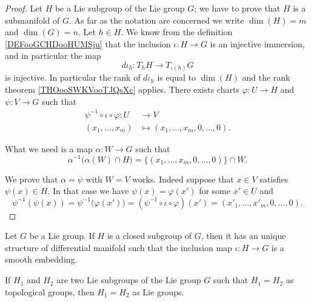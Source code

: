 \begin{proof}
    Let \( H\) be a Lie subgroup of the Lie group \( G\); we have to prove that \( H\) is a submanifold of \( G\). As far as the notation are concerned we write \( \dim(H)=m\) and \( \dim(G)=n\). Let \( h\in H\). We know from the definition \ref{DEFooGCHDooHUMSju} that the inclusion \( \iota\colon H\to G\) is an injective immersion, and in particular the map
    \begin{equation}
        d\iota_h\colon T_hH\to T_{\iota(h)}G
    \end{equation}
    is injective. In particular the rank of \( d\iota_h\) is equal to \( \dim(H)\) and the rank theorem \ref{THOooSWKVooTJQsXc} applies. There exists charts \( \varphi\colon U\to H\) and \( \psi\colon V\to G\) such that
    \begin{equation}
        \begin{aligned}
            \psi^{-1}\circ\iota\circ\varphi\colon U&\to V \\
            (x_1,\ldots, x_m)&\mapsto (x_1,\ldots, x_m,0,\ldots, 0). 
        \end{aligned}
    \end{equation}
    
    What we need is a map \( \alpha\colon W\to G\) such that
    \begin{equation}
        \alpha^{-1}\big( \alpha(W)\cap H \big)=\{ (x_1,\ldots, x_m,0,\ldots, 0) \}\cap W.
    \end{equation}
    
    We prove that \( \alpha=\psi\) with \( W=V\) works. Indeed suppose that \( x\in V\) satisfies \( \psi(x)\in H\). In that case we have \( \psi(x)=\varphi(x')\) for some \( x'\in U\) and
    \begin{equation}
            \psi^{-1}(\psi(x))=\psi^{-1}\big( \varphi(x') \big)=(\psi^{-1}\circ\iota\circ\varphi)(x')=(x'_1,\ldots, x'_m,0,\ldots, 0).
    \end{equation}
\end{proof}

\begin{theorem}     \label{THOooDEJHooVKJYBL}
    Let \( G\) be a Lie group. If \( H\) is a closed subgroup of \( G\), then it has an unique structure of differential manifold such that the inclusion map \( \iota\colon H\to G\) is a smooth embedding.
\end{theorem}

\begin{corollary}
If $H_1$ and $H_2$ are two Lie subgroups of the Lie group $G$  such that $H_1=H_2$ as topological groups, then $H_1=H_2$ as Lie groups.
 \label{cor:top_subgroup}
\end{corollary}

